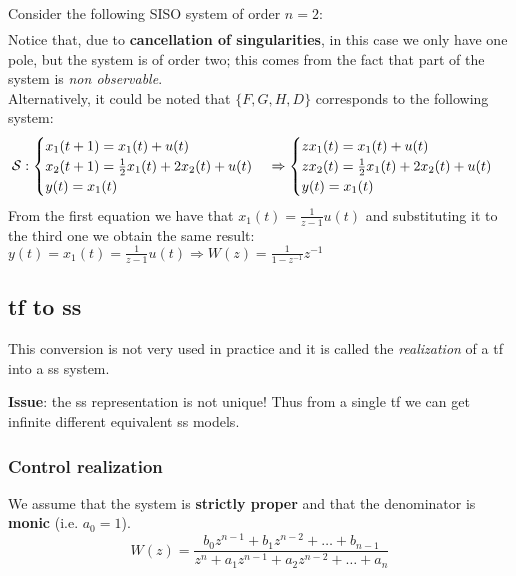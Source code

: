 \begin{example}{Consider the following SISO system of order $n=2$:}
\begin{align*}
\end{align*}
Notice that, due to \textbf{cancellation of singularities}, in this case we only have one pole, but the system is of order two; this comes from the fact that part of the system is \emph{non observable}.\\
Alternatively, it could be noted that $\{F, G, H, D\}$ corresponds to the following system:
    \[
    \mathcal{S}: 
        \begin{cases}
            x_1(t+1) = x_1(t) + u(t) \\
            x_2(t+1) = \frac{1}{2} x_1(t) + 2x_2(t) + u(t) \\
            y(t) = x_1(t)
        \end{cases}
    \Rightarrow
        \begin{cases}
            zx_1(t) = x_1(t) + u(t) \\
            zx_2(t) = \frac{1}{2} x_1(t) + 2x_2(t) + u(t) \\
            y(t) = x_1(t)
        \end{cases}    
    \]
From the first equation we have that $x_{1}(t)=\frac{1}{z-1}u(t)$ and substituting it to the third one we obtain the same result: $y(t)=x_{1}(t)=\frac{1}{z-1}u(t) \Rightarrow W(z)=\frac{1}{1-z^{-1}} z^{-1}$     

\end{example}

\subsection{\acrlong{tf} to \acrlong{ss}}
This conversion is not very used in practice and it is called the \emph{realization} of a \acrlong{tf} into a \acrlong{ss} system.

\textbf{Issue}: the \acrlong{ss} representation is not unique! Thus from a single \acrlong{tf} we can get infinite different equivalent \acrlong{ss} models.

\subsubsection{Control realization}

We assume that the system is \textbf{strictly proper} and that the denominator is \textbf{monic} (i.e. $a_0=1$).
\[ W(z) = \frac{b_0 z^{n-1} + b_1 z^{n-2} + \dots + b_{n-1}}{z^n + a_1 z^{n-1} + a_2 z^{n-2} + \dots + a_n} \]

